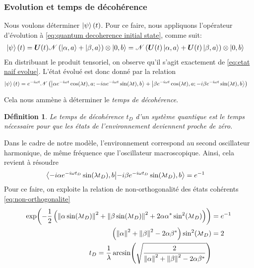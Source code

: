 \documentclass[11pt,oneside,a4paper]{article}
\newtheorem{definition}[theorem]{Définition}
\begin{document}
\subsubsection{Evolution et temps de décohérence}\label{sec:evolution et temps de decoherence}

Nous voulons déterminer $\ket{\psi}(t)$. Pour ce faire, nous appliquons l'opérateur d'évolution à \eqref{eq:quantum decoherence initial state}, comme suit:
\begin{align*}
  \ket{\psi}(t) &= \bm{U}(t)\mathcal{N}\left(\ket{\alpha,a}+\ket{\beta,a}\right)\otimes\ket{0,b} = \mathcal{N}\left(\bm{U}(t)\ket{\alpha,a}+\bm{U}(t)\ket{\beta,a}\right)\otimes\ket{0,b}
\end{align*}
En distribuant le produit tensoriel, on observe qu'il s'agit exactement de \eqref{eq:etat naif evolue}. L'état évolué est donc donné par la relation
\begin{align}
  \ket{\psi}(t) &= e^{-i\omega t}\mathcal{N}\left(\ket{\alpha e^{-i\omega t}\cos(\lambda t),a;-i\alpha e^{-i\omega t}\sin(\lambda t),b}+\ket{\beta e^{-i\omega t}\cos(\lambda t),a;-i\beta e^{-i\omega t}\sin(\lambda t),b}\right)
\end{align}

Cela nous ammène à déterminer le \emph{temps de décohérence}.
\begin{definition}
  Le temps de décohérence $t_D$ d'un système quantique est le temps nécessaire pour que les états de l'environnement deviennent proche de zéro.\label{def:temps decoherence} 
\end{definition}

Dans le cadre de notre modèle, l'environnement correspond au second oscillateur harmonique, de même fréquence que l'oscillateur macroscopique. Ainsi, cela revient à résoudre
\begin{align}
  \braket{-i\alpha e^{-i\omega t_D}\sin(\lambda t_D),b}{-i\beta e^{-i\omega t_D}\sin(\lambda t_D),b} &= e^{-1}\notag
\end{align}
Pour ce faire, on exploite la relation de non-orthogonalité des états cohérents \eqref{eq:non-orthogonalite}
\begin{align}
  \exp(-\frac{1}{2}\left(\norm{\alpha\sin(\lambda t_D)}^2+\norm{\beta\sin(\lambda t_D)}^2+2\alpha\alpha^*\sin^2(\lambda t_D)\right)) &= e^{-1}\notag\\
  \left(\norm{\alpha}^2+\norm{\beta}^2-2\alpha\beta^*\right)\sin^2(\lambda t_D) &= 2\label{eq: decoherence periodique}\\
  t_D = \frac{1}{\lambda}\arcsin(\sqrt{\frac{2}{\norm{\alpha}^2+\norm{\beta}^2-2\alpha\beta^*}})&\label{eq:decoherence time general}
\end{align}
\end{document}
